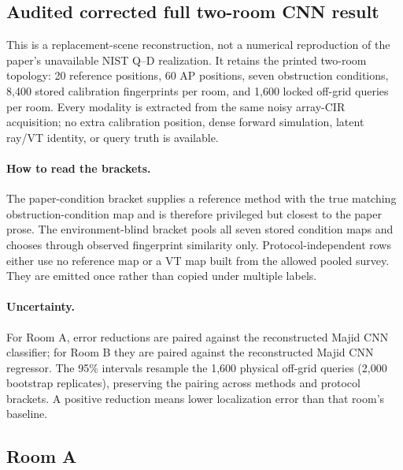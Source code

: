 \subsection*{Audited corrected full two-room CNN result}
\label{sec:cnn-corrected-full}
This is a replacement-scene reconstruction, not a numerical reproduction of the paper's unavailable NIST Q--D realization. It retains the printed two-room topology: 20 reference positions, 60 AP positions, seven obstruction conditions, 8,400 stored calibration fingerprints per room, and 1,600 locked off-grid queries per room. Every modality is extracted from the same noisy array-CIR acquisition; no extra calibration position, dense forward simulation, latent ray/VT identity, or query truth is available.
\paragraph{How to read the brackets.} The paper-condition bracket supplies a reference method with the true matching obstruction-condition map and is therefore privileged but closest to the paper prose. The environment-blind bracket pools all seven stored condition maps and chooses through observed fingerprint similarity only. Protocol-independent rows either use no reference map or a VT map built from the allowed pooled survey. They are emitted once rather than copied under multiple labels.
\paragraph{Uncertainty.} For Room A, error reductions are paired against the reconstructed Majid CNN classifier; for Room B they are paired against the reconstructed Majid CNN regressor. The 95\% intervals resample the 1,600 physical off-grid queries (2,000 bootstrap replicates), preserving the pairing across methods and protocol brackets. A positive reduction means lower localization error than that room's baseline.
\subsection{Room A}
